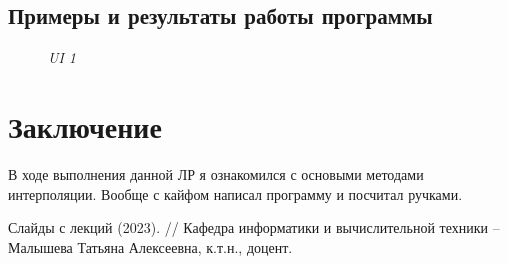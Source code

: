 \documentclass{article}
\begin{document}
      \subsection{Примеры и результаты работы программы}
            \begin{figure}[H] 
                  \begin{center}  
                        \caption{\small \sl {UI  1}}  
                  \end{center}  
            \end{figure}
            
\section{Заключение}
      В ходе выполнения данной ЛР я ознакомился с основыми методами интерполяции. Вообще с кайфом написал программу и посчитал ручками.

\begin{thebibliography}{9}
    Слайды с лекций (2023). // Кафедра информатики и вычислительной техники -- Малышева Татьяна Алексеевна, к.т.н., доцент.
\end{thebibliography} 
\end{document}

